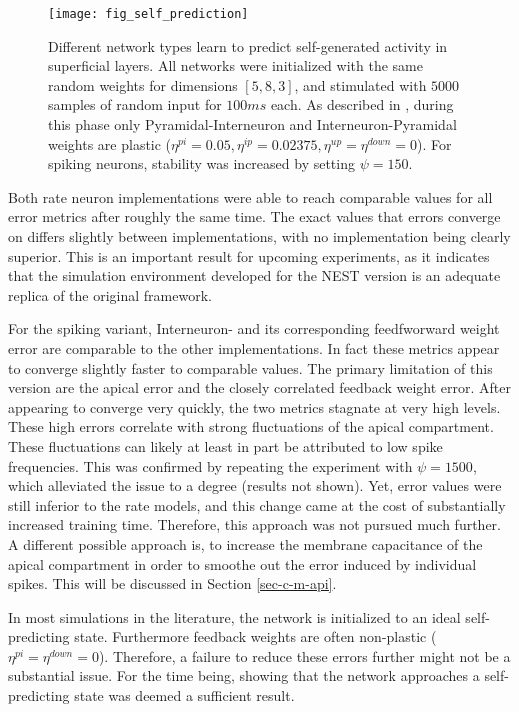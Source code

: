 \begin{figure}[t]
    \centering
    \texttt{[image: fig\_self\_prediction]}
    \caption{Different network types learn to predict self-generated activity in superficial layers. All networks were
        initialized with the same random weights for dimensions $[5, 8, 3]$, and stimulated with $5000$ samples of
        random input for $100ms$ each. As described in \cite{sacramento2018dendritic}, during this phase only
        Pyramidal-Interneuron and Interneuron-Pyramidal weights are plastic ($\eta^{pi}=0.05, \eta^{ip}=0.02375,
        \eta^{up}=\eta^{down}=0$). For spiking neurons, stability was increased by setting $\psi=150$.}
    \label{fig-self-pred}
\end{figure}

Both rate neuron implementations were able to reach comparable values for all error metrics after roughly the same time.
The exact values that errors converge on differs slightly between implementations, with no implementation being clearly
superior. This is an important result for upcoming experiments, as it indicates that the simulation environment
developed for the NEST version is an adequate replica of the original framework.

For the spiking variant, Interneuron- and its corresponding feedfworward weight error are comparable to the other
implementations. In fact these metrics appear to converge slightly faster to comparable values. The primary limitation
of this version are the apical error and the closely correlated feedback weight error. After appearing to converge very
quickly, the two metrics stagnate at very high levels. These high errors correlate with strong fluctuations of the
apical compartment. These fluctuations can likely at least in part be attributed to low spike frequencies. This was
confirmed by repeating the experiment with $\psi=1500$, which alleviated the issue to a degree (results not shown). Yet,
error values were still inferior to the rate models, and this change came at the cost of substantially increased
training time. Therefore, this approach was not pursued much further. A different possible approach is, to increase the
membrane capacitance of the apical compartment in order to smoothe out the error induced by individual spikes. This will
be discussed in Section \ref{sec-c-m-api}.

In most simulations in the literature, the network is initialized to an ideal self-predicting state. Furthermore
feedback weights are often non-plastic ($\eta^{pi}=\eta^{down}=0$). Therefore, a failure to reduce these errors further
might not be a substantial issue. For the time being, showing that the network approaches a self-predicting state was
deemed a sufficient result.



